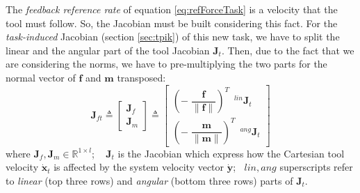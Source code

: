 The \textit{feedback reference rate} of equation \eqref{eq:refForceTask} is a velocity that the tool must follow. So, the Jacobian must be built considering this fact. For the \textit{task-induced} Jacobian (section \ref{sec:tpik}) of this new task, we have to split the linear and the angular part of the tool Jacobian $\boldsymbol{J}_t$. Then, due to the fact that we are considering the norms, we have to pre-multiplying the two parts for the normal vector of $\boldsymbol{f}$ and $\boldsymbol{m}$ transposed:
\begin{equation}
	\label{eqJacobFor}
	\boldsymbol{J}_{ft} \triangleq \begin{bmatrix}{\boldsymbol{J}}_f \\[1em] {\boldsymbol{J}}_m \end{bmatrix} \triangleq 
	\begin{bmatrix} \left( - \; \dfrac{\boldsymbol{f}}{\| \boldsymbol{f} \|}\right)^T \enspace ^{lin}\boldsymbol{J}_t  \\[1.5em]
		\left( - \; \dfrac{\boldsymbol{m}}{\| \boldsymbol{m} \|}\right) ^T \enspace ^{ang}\boldsymbol{J}_t  \end{bmatrix} 
\end{equation}
where $\boldsymbol{J}_f, \boldsymbol{J}_m \in \mathbb{R}^{1\times l}$; $\;\;\; \boldsymbol{J}_t$ is the Jacobian which express how the Cartesian tool velocity $\dot{\boldsymbol{x}}_t$ is affected by the system velocity vector  $\dot{\boldsymbol{y}}$; $\;\;lin, ang$ superscripts refer to \textit{linear} (top three rows) and \textit{angular} (bottom three rows) parts of $\boldsymbol{J}_t$.\\

